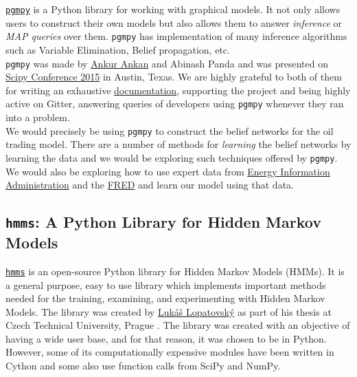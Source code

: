 \href{http://pgmpy.org/}{\texttt{pgmpy}} \cite{pgmpygit} is a Python library \cite{pgmpydoc} for working with graphical models. It not only allows users to construct their own models but also allows them to answer \textit{inference} or \textit{MAP queries} over them. \texttt{pgmpy} has implementation of many inference algorithms such as Variable Elimination, Belief propagation, etc. \\

\texttt{pgmpy} was made by \href{mailto:ankurankan@gmail.com}{Ankur Ankan} and Abinash Panda and was presented on \href{https://www.youtube.com/watch?v=Vcmjqx7lht0}{Scipy Conference 2015} in Austin, Texas. We are highly grateful to both of them for writing an exhaustive \href{https://conference.scipy.org/proceedings/scipy2015/pdfs/ankur_ankan.pdf}{documentation}, supporting the project and being highly active on Gitter, answering queries of developers using \texttt{pgmpy} whenever they ran into a problem.\\

We would precisely be using \texttt{pgmpy} to construct the belief networks for the oil trading model. There are a number of methods for \textit{learning} the belief networks by learning the data and we would be exploring such techniques offered by \texttt{pgmpy}. We would also be exploring how to use expert data from \hyperref[eia]{Energy Information Administration} and the \hyperref[fred]{FRED} and learn our model using that data.

\subsection{\texttt{hmms}: A Python Library for Hidden Markov Models}
\label{hmms}

\href{https://pypi.python.org/pypi/hmms}{\texttt{hmms}} is an open-source Python library for Hidden Markov Models (HMMs). It is a general purpose, easy to use library which implements important methods needed for the training, examining, and experimenting with Hidden Markov Models. The library was created by \href{mailto:lopatovsky@gmail.com}{Lukáš Lopatovský} as part of his thesis at Czech Technical University, Prague \cite{Lukas:Thesis:2017}.  The library was created with an objective of having a wide user base, and for that reason, it was chosen to be in Python. However, some of its computationally expensive modules have been written in Cython and some also use function calls from SciPy and NumPy. \\

